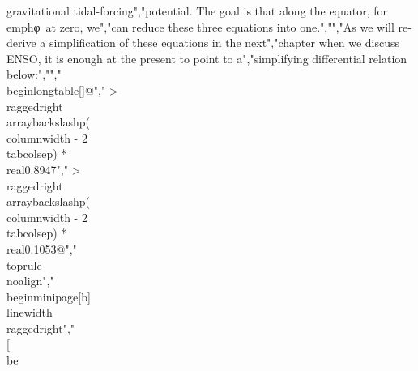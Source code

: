 {{{{{{{ gravitational tidal-forcing","potential. The goal is that along the equator, for \\emph{φ}~at zero, we","can reduce these three equations into one.","","As we will re-derive a simplification of these equations in the next","chapter when we discuss ENSO, it is enough at the present to point to a","simplifying differential relation below:","","\\begin{longtable}[]{@{}","  >{\\raggedright\\arraybackslash}p{(\\columnwidth - 2\\tabcolsep) * \\real{0.8947}}","  >{\\raggedright\\arraybackslash}p{(\\columnwidth - 2\\tabcolsep) * \\real{0.1053}}@{}}","\\toprule\\noalign{}","\\begin{minipage}[b]{\\linewidth}\\raggedright","\\[\\be}}}}}}}

